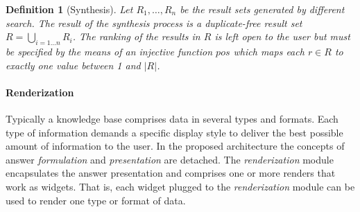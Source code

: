 \documentclass{acm_proc_article-sp}
\newtheorem{definition}{Definition}
\begin{document}
\vspace{-5mm}
\begin{definition}[Synthesis]
\vspace{-2.0mm}
\label{def:synthesis}
Let $R_1, \ldots, R_n$ be the result sets generated by different search. 
The result of the synthesis process is a duplicate-free result set $R=\bigcup\limits_{i=1 \ldots n} R_i$. %
The ranking of the results in $R$ is left open to the user but must be specified by the means of an injective function $pos$ which maps each $r \in R$ to exactly one value between 1 and $|R|$.
 
\vspace{-5.0mm}
\end{definition}

\vspace{-3.0mm}
\paragraph{\textbf{Renderization}}
Typically a knowledge base comprises data in several types and formats.
Each type of information demands a specific display style to deliver the best possible amount of information to the user.
In the proposed architecture the concepts of answer \emph{formulation} and \emph{presentation} are detached.
The \emph{renderization} module encapsulates the answer presentation and comprises one or more renders that work as widgets.
That is, each widget plugged to the \emph{renderization} module can be used to render one type or format of data.
\vspace{-4mm}
\end{document}
